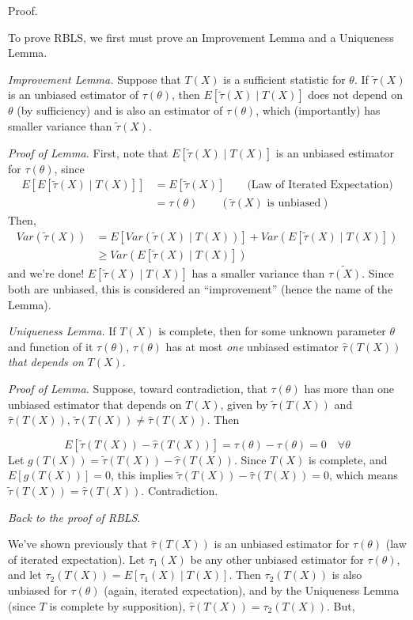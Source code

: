 \documentclass[
  letterpaper,
  DIV=11,
  numbers=noendperiod]{scrreprt}
\begin{document}
Proof.

To prove RBLS, we first must prove an Improvement Lemma and a Uniqueness
Lemma.

\emph{Improvement Lemma.} Suppose that \(T(X)\) is a sufficient
statistic for \(\theta\). If \(\tilde{\tau}(X)\) is an unbiased
estimator of \(\tau(\theta)\), then \(E[\tilde{\tau}(X) \mid T(X)]\)
does not depend on \(\theta\) (by sufficiency) and is also an estimator
of \(\tau(\theta)\), which (importantly) has smaller variance than
\(\tilde{\tau}(X)\).

\emph{Proof of Lemma.} First, note that \(E[\tilde{\tau}(X) \mid T(X)]\)
is an unbiased estimator for \(\tau(\theta)\), since \begin{align*}
    E[E[\tilde{\tau}(X) \mid T(X)]] & = E[\tilde{\tau}(X)] \quad \quad \text{(Law of Iterated Expectation)} \\
    & = \tau(\theta) \quad \quad (\tilde{\tau}(X) \text{ is unbiased})
\end{align*} Then, \begin{align*}
    Var(\tilde{\tau}(X)) & = E[Var(\tilde{\tau}(X) \mid T(X))] + Var(E[\tilde{\tau}(X) \mid T(X)]) \\
    & \geq Var(E[\tilde{\tau}(X) \mid T(X)])
\end{align*} and we're done! \(E[\tilde{\tau}(X) \mid T(X)]\) has a
smaller variance than \(\tilde{\tau(X)}\). Since both are unbiased, this
is considered an ``improvement'' (hence the name of the Lemma).

\emph{Uniqueness Lemma.} If \(T(X)\) is complete, then for some unknown
parameter \(\theta\) and function of it \(\tau(\theta)\),
\(\tau(\theta)\) has at most \emph{one} unbiased estimator
\(\hat{\tau}(T(X))\) \emph{that depends on} \(T(X)\).

\emph{Proof of Lemma.} Suppose, toward contradiction, that
\(\tau(\theta)\) has more than one unbiased estimator that depends on
\(T(X)\), given by \(\tilde{\tau}(T(X))\) and \(\hat{\tau}(T(X))\),
\(\tilde{\tau}(T(X)) \neq \hat{\tau}(T(X))\). Then

\[
E[\tilde{\tau}(T(X)) - \hat{\tau}(T(X))] = \tau(\theta) - \tau(\theta) = 0 \quad \forall \theta
\] Let \(g(T(X)) = \tilde{\tau}(T(X)) - \hat{\tau}(T(X))\). Since
\(T(X)\) is complete, and \(E[g(T(X))] = 0\), this implies
\(\tilde{\tau}(T(X)) - \hat{\tau}(T(X)) = 0\), which means
\(\tilde{\tau}(T(X)) = \hat{\tau}(T(X))\). Contradiction.

\emph{Back to the proof of RBLS}.

We've shown previously that \(\hat{\tau}(T(X))\) is an unbiased
estimator for \(\tau({\theta})\) (law of iterated expectation). Let
\(\tau_1(X)\) be any other unbiased estimator for \(\tau(\theta)\), and
let \(\tau_2(T(X)) = E[\tau_1(X) \mid T(X)]\). Then \(\tau_2(T(X))\) is
also unbiased for \(\tau(\theta)\) (again, iterated expectation), and by
the Uniqueness Lemma (since \(T\) is complete by supposition),
\(\hat{\tau}(T(X)) = \tau_2(T(X))\). But,
\end{document}
